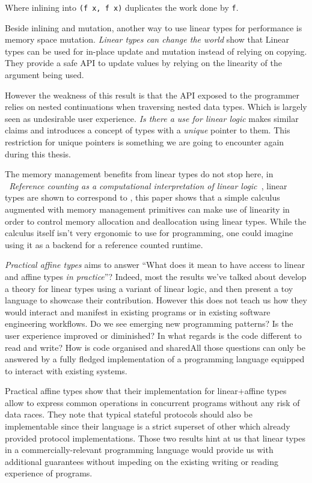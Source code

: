 \documentclass[
]{article}
\begin{document}
Where inlining into \texttt{(f\ x,\ f\ x)} duplicates the work done by
\texttt{f}.

Beside inlining and mutation, another way to use linear types for
performance is memory space mutation. \emph{Linear types can change the
world}\cite{linear_update} show that Linear types can be used for
in-place update and mutation instead of relying on copying. They provide
a safe API to update values by relying on the linearity of the argument
being used.

However the weakness of this result is that the API exposed to the
programmer relies on nested continuations when traversing nested data
types. Which is largely seen as undesirable user experience. \emph{Is
there a use for linear logic}\cite{linear-use} makes similar claims and
introduces a concept of types with a \emph{unique} pointer to them. This
restriction for unique pointers is something we are going to encounter
again during this thesis.

The memory management benefits from linear types do not stop here, in
\emph{~Reference counting as a computational interpretation of linear
logic~}\cite{linear_ref_count}, linear types are shown to correspond to
, this paper shows that a simple calculus augmented with memory
management primitives can make use of linearity in order to control
memory allocation and deallocation using linear types. While the
calculus itself isn't very ergonomic to use for programming, one could
imagine using it as a backend for a reference counted runtime.

\emph{Practical affine types}\cite{practical_affine} aims to answer
``What does it mean to have access to linear and affine types \emph{in
practice}''? Indeed, most the results we've talked about develop a
theory for linear types using a variant of linear logic, and then
present a toy language to showcase their contribution. However this does
not teach us how they would interact and manifest in existing programs
or in existing software engineering workflows. Do we see emerging new
programming patterns? Is the user experience improved or diminished? In
what regards is the code different to read and write? How is code
organised and sharedAll those questions can only be answered by a fully
fledged implementation of a programming language equipped to interact
with existing systems.

Practical affine types show that their implementation for linear+affine
types allow to express common operations in concurrent programs without
any risk of data races. They note that typical stateful protocols should
also be implementable since their language is a strict superset of other
which already provided protocol implementations. Those two results hint
at us that linear types in a commercially-relevant programming language
would provide us with additional guarantees without impeding on the
existing writing or reading experience of programs.
\end{document}
